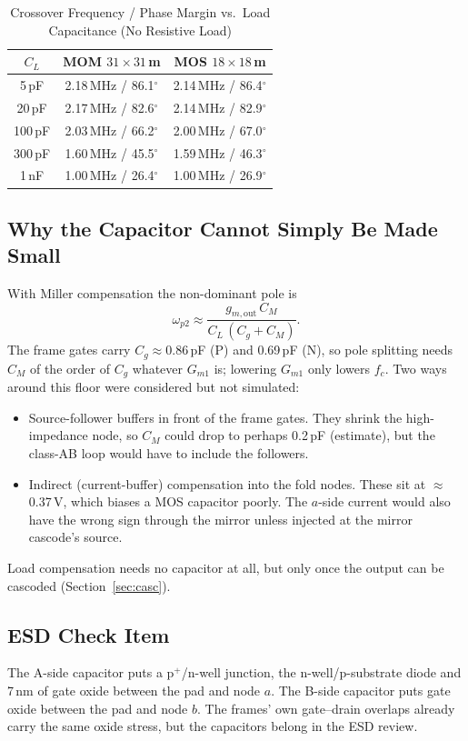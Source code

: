 \documentclass[journal]{IEEEtran}
\newcommand{\um}{\,\textmu m}
\newcommand{\MHz}{\,MHz}
\newcommand{\pF}{\,pF}
\newcommand{\dg}{$^\circ$}
\begin{document}
\begin{table}[!t]
\caption{Crossover Frequency / Phase Margin vs.\ Load Capacitance (No Resistive Load)}
\label{tab:cl}
\centering\footnotesize
\begin{tabular}{@{}ccc@{}}
\toprule
$C_L$ & MOM $31\times31$\um & MOS $18\times18$\um\\
\midrule
5\pF & 2.18\MHz{} / 86.1\dg & 2.14\MHz{} / 86.4\dg\\
20\pF & 2.17\MHz{} / 82.6\dg & 2.14\MHz{} / 82.9\dg\\
100\pF & 2.03\MHz{} / 66.2\dg & 2.00\MHz{} / 67.0\dg\\
300\pF & 1.60\MHz{} / 45.5\dg & 1.59\MHz{} / 46.3\dg\\
1\,nF & 1.00\MHz{} / 26.4\dg & 1.00\MHz{} / 26.9\dg\\
\bottomrule
\end{tabular}
\end{table}

\subsection{Why the Capacitor Cannot Simply Be Made Small}
With Miller compensation the non-dominant pole is
\begin{equation}
\omega_{p2}\approx\frac{g_{m,\mathrm{out}}\,C_M}{C_L\,(C_g+C_M)} .
\end{equation}
The frame gates carry $C_g\approx0.86$\pF{} (P) and 0.69\pF{} (N), so pole splitting needs
$C_M$ of the order of $C_g$ whatever $G_{m1}$ is; lowering $G_{m1}$ only lowers $f_c$. Two
ways around this floor were considered but not simulated:
\begin{itemize}
\item Source-follower buffers in front of the frame gates. They shrink the high-impedance
node, so $C_M$ could drop to perhaps 0.2\pF{} (estimate), but the class-AB loop would have
to include the followers.
\item Indirect (current-buffer) compensation \cite{ahuja83} into the fold nodes. These sit
at $\approx$\,0.37\,V, which biases a MOS capacitor poorly. The $a$-side current would also
have the wrong sign through the mirror unless injected at the mirror cascode's source.
\end{itemize}
Load compensation needs no capacitor at all, but only once the output can be cascoded
(Section~\ref{sec:casc}).

\subsection{ESD Check Item}
The A-side capacitor puts a p$^+$/n-well junction, the n-well/p-substrate diode and 7\,nm of
gate oxide between the pad and node $a$. The B-side capacitor puts gate oxide between the
pad and node $b$. The frames' own gate--drain overlaps already carry the same oxide stress,
but the capacitors belong in the ESD review.
\end{document}
